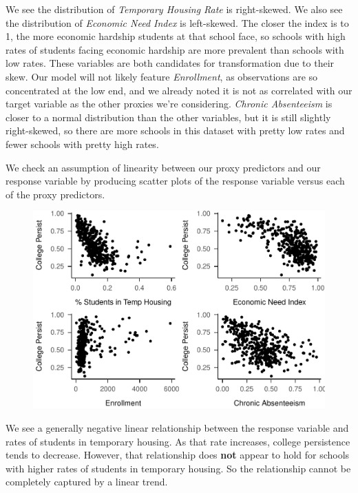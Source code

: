 \documentclass[
  man,floatsintext]{apa6}
\begin{document}
We see the distribution of \emph{Temporary Housing Rate} is right-skewed. We also see the distribution of \emph{Economic Need Index} is left-skewed. The closer the index is to 1, the more economic hardship students at that school face, so schools with high rates of students facing economic hardship are more prevalent than schools with low rates. These variables are both candidates for transformation due to their skew. Our model will not likely feature \emph{Enrollment}, as observations are so concentrated at the low end, and we already noted it is not as correlated with our target variable as the other proxies we're considering. \emph{Chronic Absenteeism} is closer to a normal distribution than the other variables, but it is still slightly right-skewed, so there are more schools in this dataset with pretty low rates and fewer schools with pretty high rates.

We check an assumption of linearity between our proxy predictors and our response variable by producing scatter plots of the response variable versus each of the proxy predictors.

\begin{figure}[H]
\includegraphics[width=\textwidth]{final-project_files/figure-latex/unnamed-chunk-6-1} \caption{ }\label{fig:unnamed-chunk-6}
\end{figure}

We see a generally negative linear relationship between the response variable and rates of students in temporary housing. As that rate increases, college persistence tends to decrease. However, that relationship does \textbf{not} appear to hold for schools with higher rates of students in temporary housing. So the relationship cannot be completely captured by a linear trend.
\end{document}
